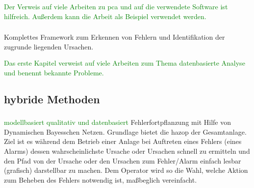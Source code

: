 \textcolor{green}{Der Verweis auf viele Arbeiten zu \ac{pca} und auf die verwendete Software ist hilfreich. Au\ss{}erdem kann die Arbeit als Beispiel verwendet werden.}

\subsubsection{\cite{Li_2016}} Komplettes Framework zum Erkennen von Fehlern und Identifikation der zugrunde liegenden Ursachen. 

\textcolor{green}{Das erste Kapitel verweist auf viele Arbeiten zum Thema datenbasierte Analyse und benennt bekannte Probleme.}

\subsection{hybride Methoden}
\subsubsection{\cite{Hu_2015}} 
\textcolor{green}{modellbasiert qualitativ und datenbasiert} \linebreak
Fehlerfortpflanzung mit Hilfe von Dynamischen Bayesschen Netzen. Grundlage bietet die \ac{hazop} der Gesamtanlage. Ziel ist es w\"ahrend dem Betrieb einer Anlage bei Auftreten eines Fehlers (eines Alarms) dessen wahrscheinlichste Ursache oder Ursachen schnell zu ermitteln und den Pfad von der Ursache oder den Ursachen zum Fehler/Alarm einfach lesbar (grafisch) darstellbar zu machen. Dem Operator wird so die Wahl, welche Aktion zum Beheben des Fehlers notwendig ist, ma\ss{}beglich vereinfacht.

